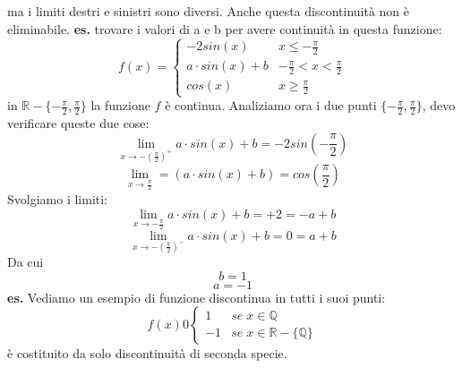 ma i limiti destri e sinistri sono diversi.
\newline
Anche questa discontinuità non è eliminabile.
\newline
\newline
\newline
\textbf{es.} trovare i valori di a e b per avere continuità in questa funzione:
\[
    f(x) = \begin{cases}
        -2 sin(x) & x\leq - \frac{\pi}{2} \\
        a \cdot  sin (x) + b & -\frac{\pi}{2}<x< \frac{\pi}{2}\\
        cos(x) & x \geq \frac{\pi}{2}
    \end{cases}
\]
in $\mathbb{R}-\{-\frac{\pi}{2}, \frac{\pi}{2}\}$ la funzione $f$ è continua.
Analiziamo ora i due punti $\{-\frac{\pi}{2}, \frac{\pi}{2}\}$, devo verificare queste due cose:
\[
    \lim_{x\rightarrow -(\frac{\pi}{2})^+} a \cdot sin(x) + b = -2 sin(-\frac{\pi}{2})
\]
\[
    \lim_{x\rightarrow \frac{\pi}{2}} = ( a \cdot  sin (x) + b ) = cos(\frac{\pi}{2})
\]
Svolgiamo i limiti:
\[
    \lim_{x\rightarrow -\frac{\pi}{2}} a \cdot sin(x) + b = +2 = -a +b
\]
\[
    \lim_{x\rightarrow -(\frac{\pi}{2})^-} a \cdot sin(x) + b = 0 = a+b
\]
Da cui 
\[
    b = 1
\]
\[
    a = -1
\]
\newline
\newline
\textbf{es.} Vediamo un esempio di funzione discontinua in tutti i suoi punti:
\[
    f(x) 0 \begin{cases}
        1 & se \; x \in \mathbb{Q} \\
        -1 & se \; x \in \mathbb{R}-\{\mathbb{Q}\}
    \end{cases}
\]
è costituito da solo discontinuità di seconda specie.
\newpage 
